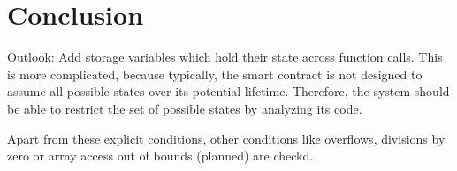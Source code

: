 \section{Conclusion}
\label{section:conclusion}

Outlook: Add storage variables which hold their state across function calls.
This is more complicated, because typically, the smart contract is not designed
to assume all possible states over its potential lifetime. Therefore, the
system should be able to restrict the set of possible states by analyzing
its code.

Apart from these explicit conditions, other conditions like overflows,
divisions by zero or array access out of bounds (planned) are checkd.
